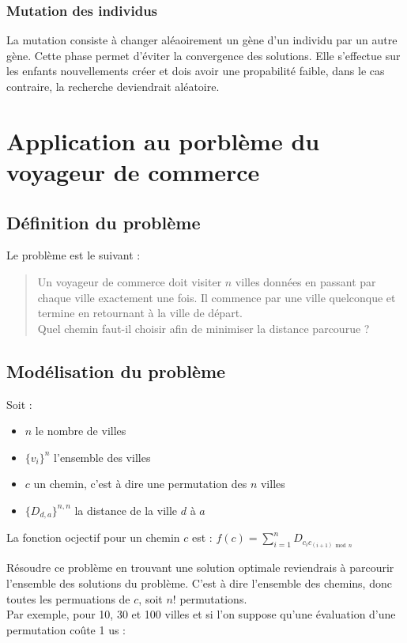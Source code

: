 \documentclass{article}
\begin{document}
        \subsubsection{Mutation des individus}
        La mutation consiste à changer aléaoirement un gène d'un individu par un autre gène. Cette phase permet d'éviter la convergence des solutions. Elle s'effectue sur les enfants nouvellements créer et dois avoir une propabilité faible, dans le cas contraire, la recherche deviendrait aléatoire.

\section{Application au porblème du voyageur de commerce}
	\subsection{Définition du problème}
	Le problème est le suivant : 
	\begin{quote}
	Un voyageur de commerce doit visiter $n$ villes données en passant par chaque ville exactement une fois. Il commence par une ville quelconque et termine en retournant à la ville de départ.\\
	Quel chemin faut-il choisir afin de minimiser la distance parcourue ?
	\end{quote}
	
	\subsection{Modélisation du problème}
    Soit :
    \begin{itemize}
        \item $n$ le nombre de villes
        \item $\{v_i\}^{n}$ l'ensemble des villes
        \item $c$ un chemin, c'est à dire une permutation des $n$ villes
        \item $\{D_{d, a}\}^{n, n}$ la distance de la ville $d$ à $a$
    \end{itemize}
    La fonction ocjectif pour un chemin $c$ est : $f(c) = \sum_{i=1}^{n}D_{ c_i c_{(i+1) \bmod n } }$

	Résoudre ce problème en trouvant une solution optimale reviendrais à parcourir l'ensemble des solutions du problème. C'est à dire l'ensemble des chemins, donc toutes les permuations de $c$, soit $n!$ permutations. \\
	Par exemple, pour 10, 30 et 100 villes et si l'on suppose qu'une évaluation d'une permutation coûte 1 us : \\
\end{document}
